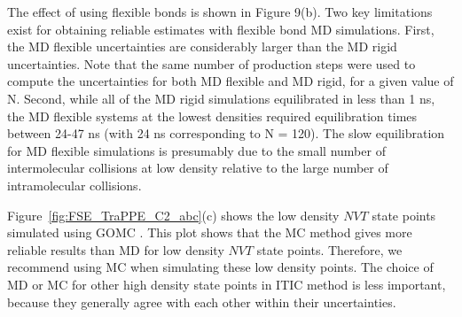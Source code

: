 \documentclass[5p,times]{elsarticle}
\begin{document}
The effect of using flexible bonds is shown in Figure 9(b). Two key limitations exist for obtaining reliable estimates with flexible bond MD simulations. First, the MD flexible uncertainties are considerably larger than the MD rigid uncertainties. Note that the same number of production steps were used to compute the uncertainties for both MD flexible and MD rigid, for a given value of N. Second, while all of the MD rigid simulations equilibrated in less than 1 ns, the MD flexible systems at the lowest densities required equilibration times between 24-47 ns (with 24 ns corresponding to N = 120). The slow equilibration for MD flexible simulations is presumably due to the small number of intermolecular collisions at low density relative to the large number of intramolecular collisions.

Figure~\ref{fig:FSE_TraPPE_C2_abc}(c) shows the low density $NVT$ state points simulated using GOMC \cite{Mick2013}. This plot shows that the MC method gives more reliable results than MD for low density $NVT$ state points. 
Therefore, we recommend using MC when simulating these low density points. The choice of MD or MC for other high density state points in ITIC method is less important, because they generally agree with each other within their uncertainties. %
\end{document}
